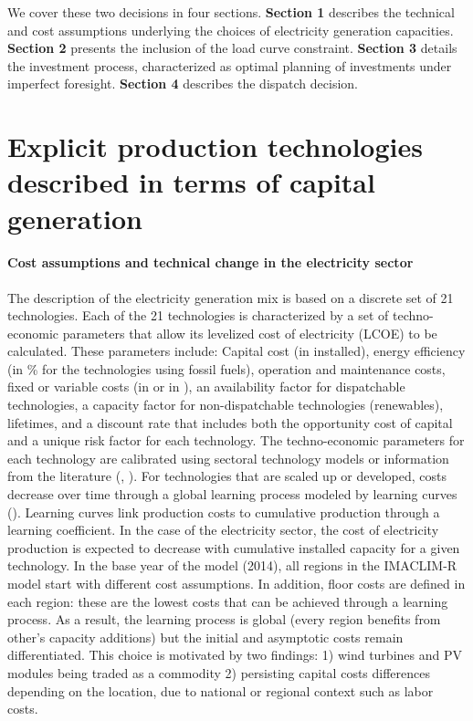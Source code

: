 {We cover these two decisions in four sections. \textbf{Section 1} describes the technical and cost assumptions underlying the choices of electricity generation capacities. \textbf{Section 2} presents the inclusion of the load curve constraint. \textbf{Section 3} details the investment process, characterized as optimal planning of investments under imperfect foresight. \textbf{Section 4} describes the dispatch decision.

\section{Explicit production technologies described in terms of capital generation}

\paragraph{ Cost assumptions and technical change in the electricity sector}

The description of the electricity generation mix is based on a discrete set of  21  technologies. Each of the  21  technologies is characterized by a set of techno-economic parameters that allow its levelized cost of electricity (LCOE) to be calculated. These parameters include: Capital cost (in \kw  installed), energy efficiency (in \% for the technologies using fossil fuels), operation and maintenance costs, fixed or variable costs (in \kw or in \kwh), an availability factor for dispatchable technologies, a capacity factor for non-dispatchable technologies (renewables), lifetimes, and a discount rate that includes both the opportunity cost of capital and a unique risk factor for each technology.
The techno-economic parameters for each technology are calibrated using sectoral technology models or information from the literature (\cite{IEA2020}, \cite{IRENA2020}).
For technologies that are scaled up or developed, costs decrease over time through a global learning process modeled by learning curves (\cite{Neij2008}). Learning curves link production costs to cumulative production through a learning coefficient. In the case of the electricity sector, the cost of electricity production is expected to decrease with cumulative installed capacity for a given technology. In the base year of the model (2014), all regions in the IMACLIM-R model start with different cost assumptions. In addition, floor costs are defined in each region: these are the lowest costs that can be achieved through a learning process. As a result, the learning process is global (every region benefits from other's capacity additions) but the initial and asymptotic costs remain differentiated. This choice is motivated by two findings: 1) wind turbines and PV modules being traded as a commodity 2) persisting capital costs differences depending on the location, due to national or regional context such as labor costs.

}

